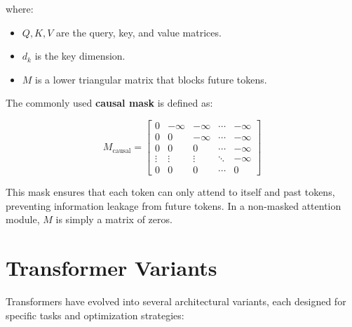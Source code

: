 where:
\begin{itemize}
    \item $Q, K, V$ are the query, key, and value matrices.
    \item $d_k$ is the key dimension.
    \item $M$ is a lower triangular matrix that blocks future tokens.
\end{itemize}

The commonly used \textbf{causal mask} is defined as:

\[
M_{\text{causal}} =
\begin{bmatrix}
0 & -\infty & -\infty & \cdots & -\infty \\
0 & 0 & -\infty & \cdots & -\infty \\
0 & 0 & 0 & \cdots & -\infty \\
\vdots & \vdots & \vdots & \ddots & -\infty \\
0 & 0 & 0 & \cdots & 0
\end{bmatrix}
\]

This mask ensures that each token can only attend to itself and past tokens, preventing information leakage from future tokens. In a non-masked attention module, $M$ is simply a matrix of zeros.

\section{Transformer Variants}

Transformers have evolved into several architectural variants, each designed for specific tasks and optimization strategies:

